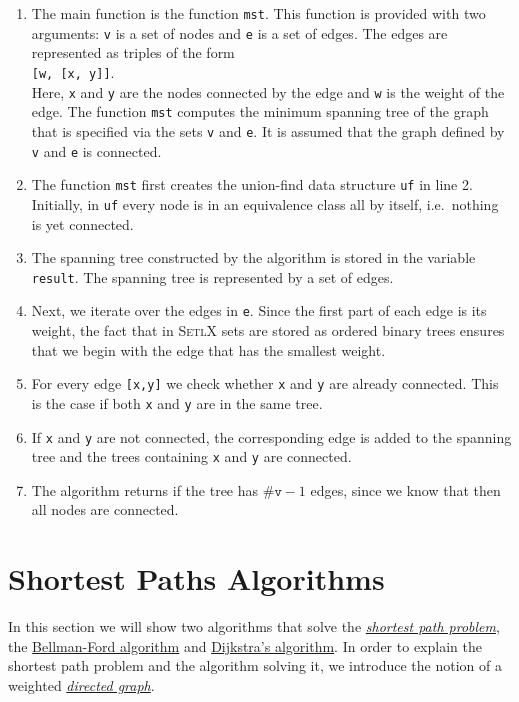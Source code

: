 \begin{enumerate}
\item The main function is the function \texttt{mst}.  This function is provided with two arguments:
      \texttt{v} is a set of nodes and \texttt{e} is a set of edges.  The edges are represented as
      triples of the form
      \\[0.2cm]
      \hspace*{1.3cm}
      \texttt{[w, [x, y]]}.
      \\[0.2cm] 
      Here, \texttt{x} and \texttt{y} are the nodes connected by the edge and \texttt{w} is the
      weight of the edge.  The function \texttt{mst} computes the minimum spanning tree of  the
      graph that is specified via the sets \texttt{v} and \texttt{e}.  It is assumed that the graph
      defined by \texttt{v} and \texttt{e} is connected.
\item The function \texttt{mst} first creates the union-find data structure \texttt{uf} in line 2.
      Initially, in \texttt{uf} every node is in an equivalence class all by itself, i.e.~nothing is
      yet connected.
\item The spanning tree constructed by the algorithm is stored in the variable \texttt{result}.
      The spanning tree is represented by a set of edges.  
\item Next, we iterate over the edges in \texttt{e}.  Since the first part of each edge is its
      weight, the fact that in \textsc{SetlX} sets are stored as ordered binary trees ensures that
      we begin with the edge that has the smallest weight.
\item For every edge \texttt{[x,y]} we check whether \texttt{x} and \texttt{y} are already
      connected.  This is the case if both \texttt{x} and \texttt{y} are in the same tree.
\item If \texttt{x} and \texttt{y} are not connected, the corresponding edge is added to the
      spanning tree and the trees containing \texttt{x} and \texttt{y} are connected.
\item The algorithm returns if the tree has $\texttt{\#v}-1$ edges, since we know that then all nodes
      are connected.
\end{enumerate}
\pagebreak

\section{Shortest Paths Algorithms}
In this section we will show two algorithms that solve the
\href{https://en.wikipedia.org/wiki/Shortest_path_problem}{\emph{shortest path problem}}, the 
\href{https://en.wikipedia.org/wiki/Bellman-Ford_algorithm}{Bellman-Ford algorithm} and
\href{https://en.wikipedia.org/wiki/Dijkstra%27s_algorithm}{Dijkstra's algorithm}.  
In order to explain the shortest path problem and the algorithm solving it, we introduce the notion
of a weighted \href{https://en.wikipedia.org/wiki/Directed_graph}{\emph{directed graph}}.


